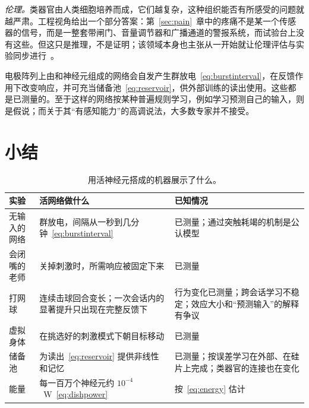 \emph{伦理。}类器官由人类细胞培养而成，它们越复杂，这种组织能否有所感受的问题就越严肃。工程视角给出一个部分答案：第~\ref{sec:pain}~章中的疼痛不是某一个传感器的信号，而是一整套带闸门、音量调节器和广播通道的警报系统，而试验台上没有这些。但这只是推理，不是证明；该领域本身也主张从一开始就让伦理评估与实验同步进行~\cite{Smirnova2023}。

\begin{keyblock}
\begin{proposition}[试验台上的活网络]
\label{prop:livingmachine}
电极阵列上由和神经元组成的网络会自发产生群放电~\eqref{eq:burstinterval}，在反馈作用下改变响应，并可充当储备池~\eqref{eq:reservoir}，供外部训练的读出使用。这些都是已测量的。至于这样的网络按某种普遍规则学习，例如学习预测自己的输入，则是假说；而关于其“有感知能力”的高调说法，大多数专家并不接受。
\end{proposition}
\end{keyblock}



\section{小结}

\begin{table}[t]
\centering
\footnotesize
\setlength{\tabcolsep}{4pt}
\renewcommand{\arraystretch}{1.15}
\begin{tabular}{>{\raggedright}p{2.8cm}>{\raggedright}p{4.2cm}>{\raggedright\arraybackslash}p{5.8cm}}
\toprule
实验 & 活网络做什么 & 已知情况 \\
\midrule
无输入的网络 & 群放电，间隔从一秒到几分钟~\eqref{eq:burstinterval} & 已测量；通过突触耗竭的机制是公认模型 \\
会闭嘴的老师 & 关掉刺激时，所需响应被固定下来 & 已测量 \\
打网球 & 连续击球回合变长；一次会话内的显著提升只出现在完整反馈下 & 行为变化已测量；跨会话学习不稳定；效应大小和“预测输入”的解释有争议 \\
虚拟身体 & 在挑选好的刺激模式下朝目标移动 & 已测量 \\
储备池 & 为读出~\eqref{eq:reservoir} 提供非线性和记忆 & 已测量；按误差学习在外部、在硅片上完成；类器官的连接也在变化 \\
能量 & 每一百万个神经元约 $10^{-4}$~W~\eqref{eq:dishpower} & 按~\eqref{eq:energy} 估计 \\
\bottomrule
\end{tabular}
\caption{用活神经元搭成的机器展示了什么。}
\label{tab:livingmachine}
\end{table}

